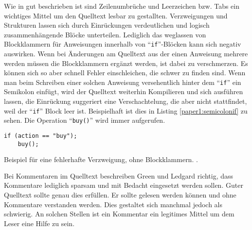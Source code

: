 Wie in \cite[S. 3, 6-8]{Green} gut beschrieben ist sind Zeilenumbrüche und Leerzeichen bzw. Tabs ein wichtiges Mittel um den Quelltext lesbar zu gestallten. Verzweigungen und Strukturen lassen sich durch Einrückungen verdeutlichen und logisch zusammenhängende Blöcke unterteilen. Lediglich das weglassen von Blockklammern für Anweisungen innerhalb von \enquote{\texttt{if}}-Blöcken kann sich negativ auswirken. Wenn bei Änderungen am Quelltext aus der einen Anweisung mehrere werden müssen die Blockklammern ergänzt werden, ist dabei zu verschmerzen. Es können sich so aber schnell Fehler einschleichen, die schwer zu finden sind. Wenn man beim Schreiben einer solchen  Anweisung versehentlich hinter dem \enquote{\texttt{if}} ein Semikolon einfügt, wird der Quelltext weiterhin Kompilieren und sich ausführen lassen, die Einrückung suggeriert eine Verschachtelung, die aber nicht stattfindet, weil der \enquote{\texttt{if}} Block leer ist. Beispielhaft ist dies in Listing \ref{paper1:semicolonif} zu sehen. Die Operation \enquote{\texttt{buy()}} wird immer aufgerufen.

\begin{listing}[H]
    \begin{verbatim}
if (action == "buy");
    buy();
    \end{verbatim}
    \label{paper1:semicolonif}
    \caption{Beispiel für eine fehlerhafte Verzweigung, ohne Blockklammern. \cite[S. 8]{Green}.}
\end{listing}

Bei Kommentaren im Quelltext beschreiben Green  und Ledgard richtig, dass Kommentare lediglich sparsam und mit Bedacht eingesetzt werden sollen\cite[S. 9]{Green}. Guter Quelltext sollte genau dies erfüllen. Er sollte gelesen werden können und ohne Kommentare verstanden werden. Dies gestaltet sich manchmal jedoch als schwierig. An solchen Stellen ist ein Kommentar ein legitimes Mittel um dem Leser eine Hilfe zu sein.

